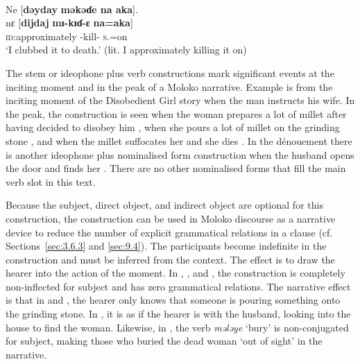 \ea \label{ex:8:45}\\
Ne  [\textbf{dəyday} \textbf{məkəɗe  na  aka}].\\
\gll  nɛ  [\textbf{dijdaj} \textbf{mɪ-kɪɗ-ɛ}  \textbf{na=aka}]\\
      {\oneS}    \textsc{id}:approximately     {\NOM}{}-kill-{\CL}   \textsc{s}.{\DO}=on\\
\glt  ‘I clubbed it to death.’ (lit. I approximately killing it on)
\z

The stem or ideophone plus verb constructions mark significant events at the inciting moment and in the peak of a Moloko narrative. Example  is from the inciting moment of the Disobedient Girl story when the man instructs his wife. In the peak, the construction is seen when the woman prepares a lot of millet after having decided to disobey him , when she pours a lot of millet on the grinding stone , and when the millet suffocates her and she dies . In the dénouement there is another ideophone plus nominalised form construction when the husband opens the door and finds her . There are no other nominalised forms that fill the main verb slot in this text. 

Because the subject, direct object, and indirect object are optional for this construction, the construction can be used in Moloko discourse as a narrative device to reduce the number of explicit grammatical relations in a clause (cf. Sections~\ref{sec:3.6.3} and \ref{sec:9.4}). The participants become indefinite in the construction and must be inferred from the context. The effect is to draw the hearer into the action of the moment. In , , and , the construction is completely non-inflected for subject and has zero grammatical relations. The narrative effect is that in  and , the hearer only knows that someone is pouring something onto the grinding stone. In  , it is as if the hearer is with the husband, looking into the house to find the woman. Likewise, in , the verb \textit{mələye }‘bury’ is non-conjugated for subject, making those who buried the dead woman ‘out of sight’ in the narrative. 
